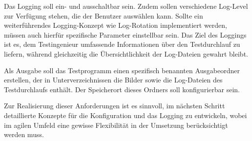 Das Logging soll ein- und ausschaltbar sein. Zudem sollen verschiedene Log-Level zur Verfügung stehen, die der Benutzer auswählen kann. Sollte ein weiterführendes 
Logging-Konzept wie Log-Rotation implementiert werden, müssen auch hierfür spezifische Parameter einstellbar sein. Das Ziel des Loggings ist es, dem Testingenieur umfassende 
Informationen über den Testdurchlauf zu liefern, während gleichzeitig die Übersichtlichkeit der Log-Dateien gewahrt bleibt.

Als Ausgabe soll das Testprogramm einen spezifisch benannten Ausgabeordner erstellen, der in Unterverzeichnissen die Bilder sowie die Log-Dateien des Testdurchlaufs enthält. 
Der Speicherort dieses Ordners soll konfigurierbar sein.

Zur Realisierung dieser Anforderungen ist es sinnvoll, im nächsten Schritt detaillierte Konzepte für die Konfiguration und das Logging zu entwickeln, wobei im agilen Umfeld eine 
gewisse Flexibilität in der Umsetzung berücksichtigt werden muss.